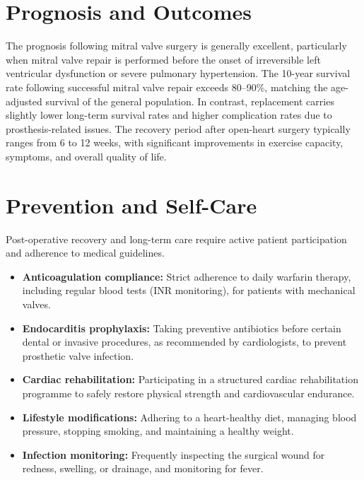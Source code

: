 \section*{Prognosis and Outcomes}
The prognosis following mitral valve surgery is generally excellent, particularly when mitral valve repair is performed before the onset of irreversible left ventricular dysfunction or severe pulmonary hypertension. The 10-year survival rate following successful mitral valve repair exceeds 80--90\%, matching the age-adjusted survival of the general population. In contrast, replacement carries slightly lower long-term survival rates and higher complication rates due to prosthesis-related issues. The recovery period after open-heart surgery typically ranges from 6 to 12 weeks, with significant improvements in exercise capacity, symptoms, and overall quality of life.

\section*{Prevention and Self-Care}
Post-operative recovery and long-term care require active patient participation and adherence to medical guidelines.
\begin{itemize}
    \item \textbf{Anticoagulation compliance:} Strict adherence to daily warfarin therapy, including regular blood tests (INR monitoring), for patients with mechanical valves.
    \item \textbf{Endocarditis prophylaxis:} Taking preventive antibiotics before certain dental or invasive procedures, as recommended by cardiologists, to prevent prosthetic valve infection.
    \item \textbf{Cardiac rehabilitation:} Participating in a structured cardiac rehabilitation programme to safely restore physical strength and cardiovascular endurance.
    \item \textbf{Lifestyle modifications:} Adhering to a heart-healthy diet, managing blood pressure, stopping smoking, and maintaining a healthy weight.
    \item \textbf{Infection monitoring:} Frequently inspecting the surgical wound for redness, swelling, or drainage, and monitoring for fever.
\end{itemize}


